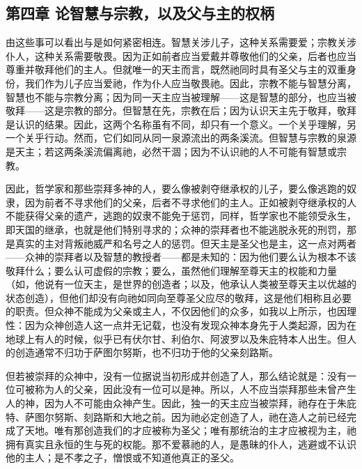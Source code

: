 
\subsection{第四章 论智慧与宗教，以及父与主的权柄}

由这些事可以看出与是如何紧密相连。智慧关涉儿子，这种关系需要爱；宗教关涉仆人，这种关系需要敬畏。因为正如前者应当爱戴并尊敬他们的父亲，后者也应当尊重并敬拜他们的主人。但就唯一的天主而言，既然祂同时具有圣父与主的双重身份，我们作为儿子应当爱祂，作为仆人应当敬畏祂。因此，宗教不能与智慧分离，智慧也不能与宗教分离；因为同一天主应当被理解——这是智慧的部分，也应当被敬拜——这是宗教的部分。但智慧在先，宗教在后；因为认识天主先于敬拜，敬拜是认识的结果。因此，这两个名称虽有不同，却只有一个意义。一个关乎理解，另一个关乎行动。然而，它们如同从同一泉源流出的两条溪流。但智慧与宗教的泉源是天主；若这两条溪流偏离祂，必然干涸；因为不认识祂的人不可能有智慧或宗教。\par

因此，哲学家和那些崇拜多神的人，要么像被剥夺继承权的儿子，要么像逃跑的奴隶，因为前者不寻求他们的父亲，后者不寻求他们的主人。正如被剥夺继承权的人不能获得父亲的遗产，逃跑的奴隶不能免于惩罚，同样，哲学家也不能领受永生，即天国的继承，也就是他们特别寻求的；众神的崇拜者也不能逃脱永死的刑罚，那是真实的主对背叛祂威严和名号之人的惩罚。但天主是圣父也是主，这一点对两者——众神的崇拜者以及智慧的教授者——都是未知的：因为他们要么认为根本不该敬拜什么；要么认可虚假的宗教；要么，虽然他们理解至尊天主的权能和力量（如，他说有一位天主，是世界的创造者；以及，他承认人类被至尊天主以优越的状态创造），但他们却没有向祂如同向至尊圣父应尽的敬拜，这是他们相称且必要的职责。但众神不能成为父亲或主人，不仅因他们的众多，如我以上所示，也因理性：因为众神创造人这一点并无记载，也没有发现众神本身先于人类起源，因为在地球上有人的时候，似乎已有伏尔甘、利伯尔、阿波罗以及朱庇特本人出生。但人的创造通常不归功于萨图尔努斯，也不归功于他的父亲刻路斯。\par

但若被崇拜的众神中，没有一位据说当初形成并创造了人，那么结论就是：没有一位可被称为人的父亲，因此没有一位可以是神。所以，人不应当崇拜那些未曾产生人的神，因为人不可能由众神产生。因此，独一的天主应当被崇拜，祂存在于朱庇特、萨图尔努斯、刻路斯和大地之前。因为祂必定创造了人，祂在造人之前已经完成了天地。唯有那创造我们的才应被称为圣父；唯有那统治的主才应被视为主，祂拥有真实且永恒的生与死的权能。那不爱慕祂的人，是愚昧的仆人，逃避或不认识他的主人；是不孝之子，憎恨或不知道他真正的圣父。\par

